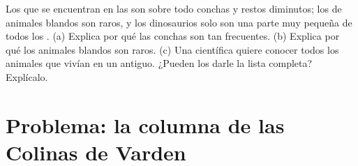 \begin{exercise}[$\star\star\star$]\label{exo:g7:sediments-and-fossils:12}
Los  que se encuentran en las  son sobre todo conchas y restos
diminutos; los  de animales blandos son raros, y los dinosaurios
solo son una parte muy pequeña de todos los . (a) Explica por qué
las conchas son tan frecuentes. (b) Explica por qué los animales blandos
son raros. (c) Una científica quiere conocer todos los animales que
vivían en un  antiguo. ¿Pueden los  darle la lista completa?
Explícalo.
\end{exercise}

\section{Problema: la columna de las Colinas de Varden}

